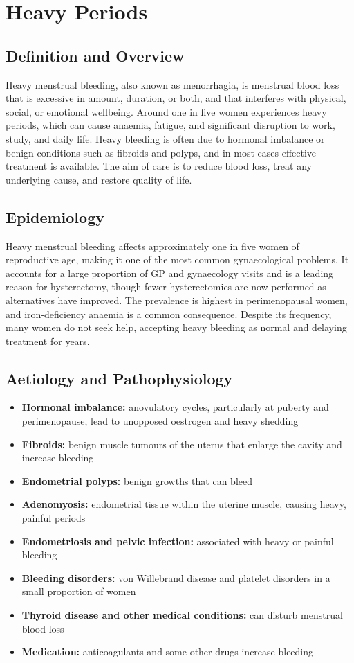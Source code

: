 \chapter{Heavy Periods}

\section*{Definition and Overview}
Heavy menstrual bleeding, also known as menorrhagia, is menstrual blood loss that is excessive in amount, duration, or both, and that interferes with physical, social, or emotional wellbeing. Around one in five women experiences heavy periods, which can cause anaemia, fatigue, and significant disruption to work, study, and daily life. Heavy bleeding is often due to hormonal imbalance or benign conditions such as fibroids and polyps, and in most cases effective treatment is available. The aim of care is to reduce blood loss, treat any underlying cause, and restore quality of life.

\section*{Epidemiology}
Heavy menstrual bleeding affects approximately one in five women of reproductive age, making it one of the most common gynaecological problems. It accounts for a large proportion of GP and gynaecology visits and is a leading reason for hysterectomy, though fewer hysterectomies are now performed as alternatives have improved. The prevalence is highest in perimenopausal women, and iron-deficiency anaemia is a common consequence. Despite its frequency, many women do not seek help, accepting heavy bleeding as normal and delaying treatment for years.

\section*{Aetiology and Pathophysiology}
\begin{itemize}
    \item \textbf{Hormonal imbalance:} anovulatory cycles, particularly at puberty and perimenopause, lead to unopposed oestrogen and heavy shedding
    \item \textbf{Fibroids:} benign muscle tumours of the uterus that enlarge the cavity and increase bleeding
    \item \textbf{Endometrial polyps:} benign growths that can bleed
    \item \textbf{Adenomyosis:} endometrial tissue within the uterine muscle, causing heavy, painful periods
    \item \textbf{Endometriosis and pelvic infection:} associated with heavy or painful bleeding
    \item \textbf{Bleeding disorders:} von Willebrand disease and platelet disorders in a small proportion of women
    \item \textbf{Thyroid disease and other medical conditions:} can disturb menstrual blood loss
    \item \textbf{Medication:} anticoagulants and some other drugs increase bleeding
\end{itemize}

